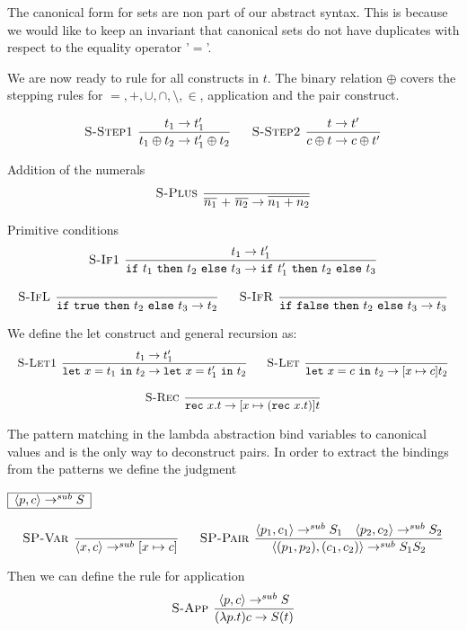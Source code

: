 \documentclass[a4paper]{article}
\newcommand{\s}[1]{\mathtt{#1}}
\newcommand{\sif}{\s{if\ }}
\newcommand{\sthen}{\s{\ then\ }}
\newcommand{\selse}{\s{\ else\ }}
\newcommand{\sifthenelse}[3]{\sif #1 \sthen #2 \selse #3}
\newcommand{\sletin}[2]{\s{let\ } #1 \s{\ in\ } #2}
\newcommand{\srec}{\s{rec\ }}
\newcommand{\strue}{\s{true}}
\newcommand{\sfalse}{\s{false}}
\newcommand{\step}{\to}
\newcommand{\stepsub}{\step^{sub}}
\newcommand{\angled}[1]{\langle #1\rangle}
\renewcommand{\rule}[3][]{\ \mbox{\textsc{#1 }}\dfrac{#2}{#3}\ }
\newcommand{\smbox}[1]{
  $\begin{array}{|c|}
    \hline
    #1 \\
    \hline
  \end{array}$
}
\begin{document}
The canonical form for sets are non part of our abstract syntax. This
is because we would like to keep an invariant that canonical sets
do not have duplicates with respect to the equality operator '$\s{=}$'.


We are now ready to rule for all constructs in $t$. The binary relation $\oplus$ covers the stepping rules for $= ,+,\cup, \cap,\setminus,\in$, application and the pair construct.

\[\begin{array}{c}
\rule[S-Step1]{t_1 \step t_1'}{t_1 \oplus t_2 \step t_1' \oplus t_2}\quad
\rule[S-Step2]{t \step t'}{c \oplus t \step c \oplus t'}
\end{array}
\]

Addition of the numerals
\[
\rule[S-Plus]{}{\overline{n_1} \s{\ +\ } \overline{n_2} \step \overline{n_1 + n_2}}
\]

Primitive conditions
\[\begin{array}{c}
\rule[S-If1]{t_1 \step t_1'}{\sifthenelse{t_1}{t_2}{t_3} \step \sifthenelse{t_1'}{t_2}{t_3}}\\\\
\rule[S-IfL]{}{\sifthenelse{\strue}{t_2}{t_3} \step t_2}\quad
\rule[S-IfR]{}{\sifthenelse{\sfalse}{t_2}{t_3} \step t_3}
\end{array}\]

We define the let construct and general recursion as:
\[\begin{array}{c}
\rule[S-Let1]{t_1 \step t_1'}
  {\sletin{x=t_1}{t_2} \step \sletin{x=t_1'}{t_2}}\quad
\rule[S-Let]{}{\sletin{x=c}{t_2} \step [x \mapsto c ] t_2}\\\\
\rule[S-Rec]{}{\srec x.t \step [x \mapsto (\srec x.t)] t}
\end{array}\]


The pattern matching in the lambda abstraction bind variables to
canonical values and is the only way to deconstruct pairs.
In order to extract the bindings from the patterns we define the
judgment


\smbox{\angled{p,c} \stepsub S}
\[
\rule[SP-Var]{}{\angled{x,c} \stepsub [x\mapsto c]}\quad
\rule[SP-Pair]{\angled{p_1, c_1} \stepsub S_1 \quad \angled{p_2, c_2} \stepsub S_2}
{\angled{(p_1,p_2), (c_1, c_2)} \stepsub S_1S_2}
\]

Then we can define the rule for application
\[
\rule[S-App]{\angled{p, c} \stepsub S}{(\lambda p.t) c \step S(t)}
\]
\end{document}
